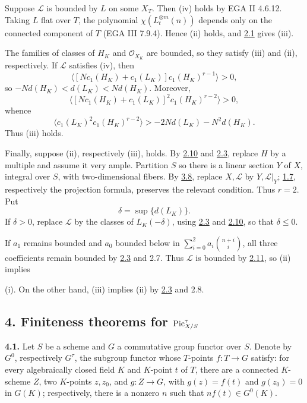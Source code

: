 Suppose \(\mathscr L\) is bounded by \(L\) on some \(X_T\). Then (iv)
holds by EGA II 4.6.12. Taking \(L\) flat over \(T\), the polynomial
\(\chi(L_t^{\otimes m}(n))\) depends only on the connected component of
\(T\) (EGA III 7.9.4). Hence (ii) holds, and \hyperlink{sga6.e13.para.2-1}{2.1} gives (iii).

The families of classes of \(H_K\) and \(\mathcal O_{X_K}\) are bounded,
so they satisfy (iii) and (ii), respectively. If \(\mathscr L\) satisfies
(iv), then
\[
\langle[Nc_1(H_K)+c_1(L_K)]c_1(H_K)^{r-1}\rangle>0,
\]
so \(-Nd(H_K)<d(L_K)<Nd(H_K)\). Moreover,
\[
\langle[Nc_1(H_K)+c_1(L_K)]^2c_1(H_K)^{r-2}\rangle>0,
\]
whence
\[
\langle c_1(L_K)^2c_1(H_K)^{r-2}\rangle
>-2Nd(L_K)-N^2d(H_K).
\]
Thus (iii) holds.

Finally, suppose (ii), respectively (iii), holds. By \hyperlink{sga6.e13.rem.2-10}{2.10} and \hyperlink{sga6.e13.lem.2-3}{2.3},
replace \(H\) by a multiple and assume it very ample. Partition \(S\) so
there is a linear section \(Y\) of \(X\), integral over \(S\), with
two-dimensional fibers. By \hyperlink{sga6.e13.thm.3-8}{3.8}, replace \(X,\mathscr L\) by
\(Y,\mathscr L|_Y\); \hyperlink{sga6.e13.lem.1-7}{1.7}, respectively the projection formula, preserves
the relevant condition. Thus \(r=2\). Put
\[
\delta=\sup\{d(L_K)\}.
\]
If \(\delta>0\), replace \(\mathscr L\) by the classes of
\(L_K(-\delta)\), using \hyperlink{sga6.e13.lem.2-3}{2.3} and \hyperlink{sga6.e13.rem.2-10}{2.10}, so that \(\delta\le0\).

If \(a_1\) remains bounded and \(a_0\) bounded below in
\(\sum_{i=0}^{2}a_i\binom{n+i}{i}\), all three coefficients remain
bounded by \hyperlink{sga6.e13.lem.2-3}{2.3} and 2.7. Thus \(\mathscr L\) is bounded by \hyperlink{sga6.e13.lem.2-11}{2.11}, so (ii)
implies

(i). On the other hand, (iii) implies (ii) by \hyperlink{sga6.e13.lem.2-3}{2.3} and 2.8.

\subsection*{4. Finiteness theorems for \(\operatorname{Pic}^\tau_{X/S}\)}

\textbf{4.1.} Let \(S\) be a scheme and \(G\) a commutative group functor
over \(S\). Denote by \(G^0\), respectively \(G^\tau\), the subgroup
functor whose \(T\)-points \(f:T\to G\) satisfy: for every algebraically
closed field \(K\) and \(K\)-point \(t\) of \(T\), there are a connected
\(K\)-scheme \(Z\), two \(K\)-points \(z,z_0\), and \(g:Z\to G\), with
\(g(z)=f(t)\) and \(g(z_0)=0\) in \(G(K)\); respectively, there is a
nonzero \(n\) such that \(nf(t)\in G^0(K)\).

